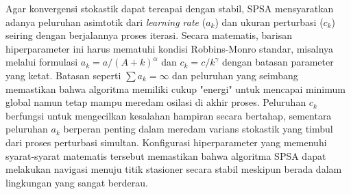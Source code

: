 Agar konvergensi stokastik dapat tercapai dengan stabil, SPSA mensyaratkan adanya peluruhan asimtotik dari \textit{learning rate} ($a_k$) dan ukuran perturbasi ($c_k$) seiring dengan berjalannya proses iterasi. Secara matematis, barisan hiperparameter ini harus mematuhi kondisi Robbins-Monro standar, misalnya melalui formulasi $a_k = a / (A + k)^\alpha$ dan $c_k = c / k^\gamma$ dengan batasan parameter yang ketat. Batasan seperti $\sum a_k = \infty$ dan peluruhan yang seimbang memastikan bahwa algoritma memiliki cukup "energi" untuk mencapai minimum global namun tetap mampu meredam osilasi di akhir proses. Peluruhan $c_k$ berfungsi untuk mengecilkan kesalahan hampiran secara bertahap, sementara peluruhan $a_k$ berperan penting dalam meredam varians stokastik yang timbul dari proses perturbasi simultan. Konfigurasi hiperparameter yang memenuhi syarat-syarat matematis tersebut memastikan bahwa algoritma SPSA dapat melakukan navigasi menuju titik stasioner secara stabil meskipun berada dalam lingkungan yang sangat berderau.
